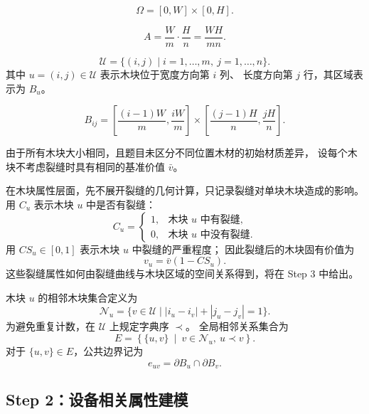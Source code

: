 ﻿\documentclass[UTF8,12pt,a4paper]{ctexart}
\begin{document}
\begin{description}[leftmargin=2em,labelsep=0.5em,itemsep=0.6em]
  \item[\textbf{木板区域：}]
\[
\Omega=[0,W]\times[0,H].
\]

  \item[\textbf{木块面积：}]
\[
A=\frac{W}{m}\cdot\frac{H}{n}
=\frac{WH}{mn}.
\]

  \item[\textbf{木块索引集合：}]
\[
\mathcal U=\{(i,j)\mid i=1,\ldots,m,\ j=1,\ldots,n\}.
\]
其中 \(u=(i,j)\in\mathcal U\) 表示木块位于宽度方向第 \(i\) 列、
长度方向第 \(j\) 行，其区域表示为 \(B_u\)。

  \item[\textbf{木块区域：}]
\[
B_{ij}
=
\left[\frac{(i-1)W}{m},\frac{iW}{m}\right]
\times
\left[\frac{(j-1)H}{n},\frac{jH}{n}\right].
\]

  \item[\textbf{基准价值：}]
由于所有木块大小相同，且题目未区分不同位置木材的初始材质差异，
设每个木块不考虑裂缝时具有相同的基准价值 \(\bar v\)。

  \item[\textbf{裂缝相关属性：}]
在木块属性层面，先不展开裂缝的几何计算，只记录裂缝对单块木块造成的影响。
用 \(C_u\) 表示木块 \(u\) 中是否有裂缝：
\[
C_u=
\begin{cases}
1, & \text{木块 \(u\) 中有裂缝},\\
0, & \text{木块 \(u\) 中没有裂缝}.
\end{cases}
\]
用 \(CS_u\in[0,1]\) 表示木块 \(u\) 中裂缝的严重程度；
因此裂缝后的木块固有价值为
\[
v_u=\bar v(1-CS_u).
\]
这些裂缝属性如何由裂缝曲线与木块区域的空间关系得到，将在 Step 3 中给出。

  \item[\textbf{相邻关系：}]
木块 \(u\) 的相邻木块集合定义为
\[
\mathcal N_u
=
\{v\in\mathcal U\mid |i_u-i_v|+|j_u-j_v|=1\}.
\]
为避免重复计数，在 \(\mathcal U\) 上规定字典序 \(\prec\)。
全局相邻关系集合为
\[
E=
\left\{
\{u,v\}\ \middle|\
v\in\mathcal N_u,\ u\prec v
\right\}.
\]
对于 \(\{u,v\}\in E\)，公共边界记为
\[
e_{uv}=\partial B_u\cap\partial B_v.
\]
\end{description}

\subsection{Step 2：设备相关属性建模}
\end{document}
